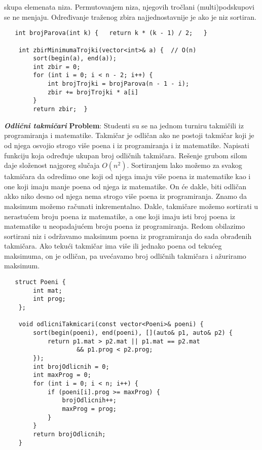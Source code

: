 \documentclass{article}
\begin{document}
skupa elemenata niza. Permutovanjem
niza, njegovih tročlani (multi)podskupovi se ne menjaju. Određivanje traženog zbira najjednostavnije je ako je niz sortiran.
\begin{lstlisting}
   int brojParova(int k) {   return k * (k - 1) / 2;   }

    int zbirMinimumaTrojki(vector<int>& a) {  // O(n)
        sort(begin(a), end(a));
        int zbir = 0;
        for (int i = 0; i < n - 2; i++) {
            int brojTrojki = brojParova(n - 1 - i);
            zbir += brojTrojki * a[i]
        }
        return zbir;  }
\end{lstlisting}
\textit{\textbf{Odlični takmičari}}
\vspace{0.2cm}\newline
\textbf{Problem}: Studenti su se na jednom turniru takmičili iz programiranja i matematike. Takmičar je odličan ako ne postoji takmičar koji je od njega osvojio strogo
više poena i iz programiranja i iz matematike. Napisati funkciju koja određuje
ukupan broj odličnih takmičara.
\newline
Rešenje grubom silom daje složenost najgoreg slučaja $O(n^2)$. \newline
Sortiranjem lako možemo za svakog
takmičara da odredimo one koji od njega imaju više poena iz
matematike kao i one koji imaju manje poena od njega iz
matematike.
On će dakle, biti odličan akko niko desno od njega nema strogo više poena iz programiranja. Znamo da maksimum možemo računati inkrementalno. 
Dakle, takmičare možemo sortirati u nerastućem broju poena iz matematike, a
one koji imaju isti broj poena iz matematike u neopadajućem broju poena iz
programiranja. Redom obilazimo sortirani niz i održavamo maksimum poena
iz programiranja do sada obrađenih takmičara. Ako tekući takmičar ima više
ili jednako poena od tekućeg maksimuma, on je odličan, pa uvećavamo broj
odličnih takmičara i ažuriramo maksimum.
\begin{lstlisting}
   struct Poeni {
        int mat;
        int prog;
    };
    
    void odlicniTakmicari(const vector<Poeni>& poeni) {
        sort(begin(poeni), end(poeni), [](auto& p1, auto& p2) {
            return p1.mat > p2.mat || p1.mat == p2.mat 
                    && p1.prog < p2.prog;
        });
        int brojOdlicnih = 0;
        int maxProg = 0;
        for (int i = 0; i < n; i++) {
            if (poeni[i].prog >= maxProg) {
                brojOdlicnih++;
                maxProg = prog;
            }
        }
        return brojOdlicnih;
    }
\end{lstlisting}
\end{document}
